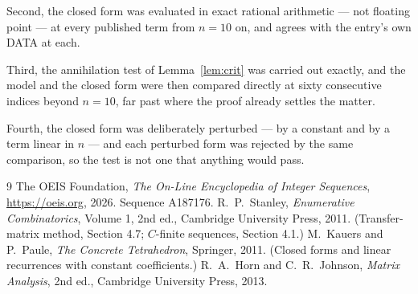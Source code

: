 \documentclass[11pt,a4paper]{article}
\theoremstyle{plain}
\theoremstyle{definition}
\begin{document}
Second, the closed form was evaluated in exact rational arithmetic --- not floating point ---
at every published term from $n=10$ on, and agrees with the entry's own DATA at each.

Third, the annihilation test of Lemma~\ref{lem:crit} was carried out exactly, and the model
and the closed form were then compared directly at sixty consecutive indices beyond
$n=10$, far past where the proof already settles the matter.

Fourth, the closed form was deliberately perturbed --- by a constant and by a term linear in
$n$ --- and each perturbed form was rejected by the same comparison, so the test is not one
that anything would pass.

\begin{thebibliography}{9}
 The OEIS Foundation, \emph{The On-Line Encyclopedia of Integer
Sequences}, \url{https://oeis.org}, 2026. Sequence A187176.
 R.~P.~Stanley, \emph{Enumerative Combinatorics}, Volume 1, 2nd ed.,
Cambridge University Press, 2011. (Transfer-matrix method, Section 4.7; $C$-finite sequences,
Section 4.1.)
 M.~Kauers and P.~Paule, \emph{The Concrete Tetrahedron}, Springer, 2011.
(Closed forms and linear recurrences with constant coefficients.)
 R.~A.~Horn and C.~R.~Johnson, \emph{Matrix Analysis}, 2nd ed., Cambridge
University Press, 2013.
\end{thebibliography}
\end{document}
